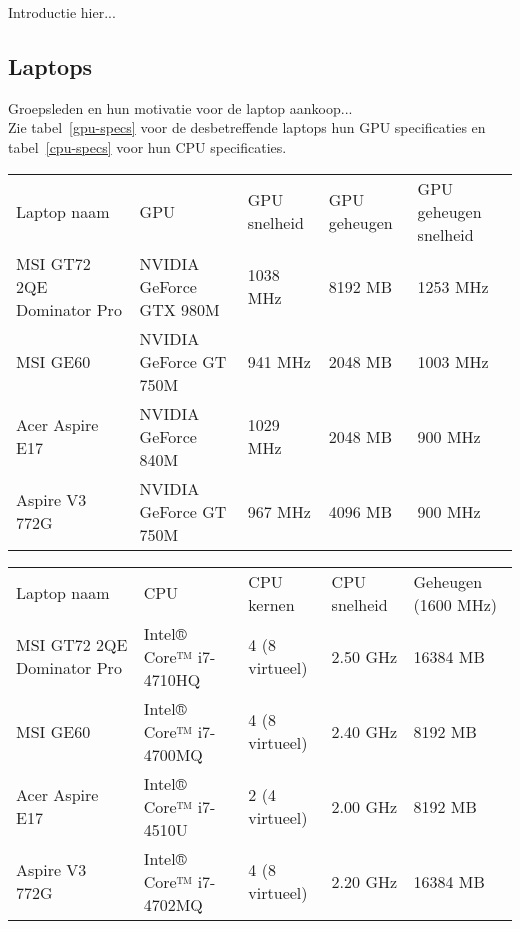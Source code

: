 Introductie hier...
\subsection{Laptops}
Groepsleden en hun motivatie voor de laptop aankoop...\\
Zie tabel~\ref{gpu-specs} voor de desbetreffende laptops hun GPU specificaties en tabel~\ref{cpu-specs} voor hun CPU specificaties.
\begin{table*}[t]
\centering
\caption{GPU specificaties}
\label{gpu-specs}
\begin{tabular}{lllll}
Laptop naam                & GPU                     & GPU snelheid & GPU geheugen & GPU geheugen snelheid \\
MSI GT72 2QE Dominator Pro & NVIDIA GeForce GTX 980M & 1038 MHz  & 8192 MB    & 1253 MHz         \\
MSI GE60                   & NVIDIA GeForce GT 750M  & 941 MHz   & 2048 MB    & 1003 MHz          \\
Acer Aspire E17            & NVIDIA GeForce 840M     & 1029 MHz  & 2048 MB    & 900 MHz          \\
Aspire V3 772G             & NVIDIA GeForce GT 750M  & 967 MHz   & 4096 MB    & 900 MHz         
\end{tabular}
\end{table*}
\begin{table*}[t]
\centering
\caption{CPU \& Geheugen specificaties}
\label{cpu-specs}
\begin{tabular}{lllll}
Laptop naam				   & CPU                    & CPU kernen     & CPU snelheid	& Geheugen (1600 MHz)  \\
MSI GT72 2QE Dominator Pro & Intel® Core™ i7-4710HQ & 4 (8 virtueel) & 2.50 GHz	& 16384 MB	\\
MSI GE60                   & Intel® Core™ i7-4700MQ & 4 (8 virtueel) & 2.40 GHz	& 8192 MB	\\
Acer Aspire E17            & Intel® Core™ i7-4510U  & 2 (4 virtueel) & 2.00 GHz	& 8192 MB	\\
Aspire V3 772G             & Intel® Core™ i7-4702MQ & 4 (8 virtueel) & 2.20 GHz	& 16384 MB 
\end{tabular}
\end{table*}